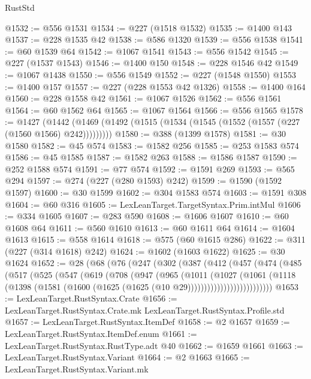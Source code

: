 \begin{lexlean}{RustStd}
\begin{coremodule}
@1532 := @556 @1531
@1534 := @227 (@1518 @1532)
@1535 := @1400 @143
@1537 := @228 @1535 @42
@1538 := @586 @1320
@1539 := @556 @1538
@1541 := @60 @1539 @64
@1542 := @1067 @1541
@1543 := @556 @1542
@1545 := @227 (@1537 @1543)
@1546 := @1400 @150
@1548 := @228 @1546 @42
@1549 := @1067 @1438
@1550 := @556 @1549
@1552 := @227 (@1548 @1550)
@1553 := @1400 @157
@1557 := @227 (@228 @1553 @42 @1326)
@1558 := @1400 @164
@1560 := @228 @1558 @42
@1561 := @1067 @1526
@1562 := @556 @1561
@1564 := @60 @1562 @64
@1565 := @1067 @1564
@1566 := @556 @1565
@1578 := @1427
    (@1442 (@1469 (@1492 (@1515 (@1534 (@1545 (@1552 (@1557 (@227 (@1560 @1566) @242)))))))))
@1580 := @388 (@1399 @1578)
@1581 := @30 @1580
@1582 := @45 @574
@1583 := @1582 @256
@1585 := @253 @1583 @574
@1586 := @45 @1585
@1587 := @1582 @263
@1588 := @1586 @1587
@1590 := @252 @1588 @574
@1591 := @77 @574
@1592 := @1591 @269
@1593 := @565 @294
@1597 := @274 (@227 (@280 @1593) @242)
@1599 := @1590 (@1592 @1597)
@1600 := @30 @1599
@1602 := @304 @1583 @574
@1603 := @1591 @308
@1604 := @60 @316
@1605 := LexLeanTarget.TargetSyntax.Prim.intMul
@1606 := @334 @1605
@1607 := @283 @590
@1608 := @1606 @1607
@1610 := @60 @1608 @64
@1611 := @560 @1610
@1613 := @60 @1611 @64
@1614 := @1604 @1613
@1615 := @558 @1614
@1618 := @575 (@60 @1615 @286)
@1622 := @311 (@227 (@314 @1618) @242)
@1624 := @1602 (@1603 @1622)
@1625 := @30 @1624
@1652 := @28
    (@68
      (@76
        (@247
          (@302
            (@387
              (@412
                (@457
                  (@474
                    (@485
                      (@517
                        (@525
                          (@547
                            (@619
                              (@708
                                (@947
                                  (@965
                                    (@1011
                                      (@1027
                                        (@1061
                                          (@1118
                                            (@1398
                                              (@1581
                                                (@1600
                                                  (@1625 (@1625 (@10 @29))))))))))))))))))))))))))
@1653 := LexLeanTarget.RustSyntax.Crate
@1656 := LexLeanTarget.RustSyntax.Crate.mk LexLeanTarget.RustSyntax.Profile.std
@1657 := LexLeanTarget.RustSyntax.ItemDef
@1658 := @2 @1657
@1659 := LexLeanTarget.RustSyntax.ItemDef.enum
@1661 := LexLeanTarget.RustSyntax.RustType.adt @40
@1662 := @1659 @1661
@1663 := LexLeanTarget.RustSyntax.Variant
@1664 := @2 @1663
@1665 := LexLeanTarget.RustSyntax.Variant.mk

\end{coremodule}
\end{lexlean}
